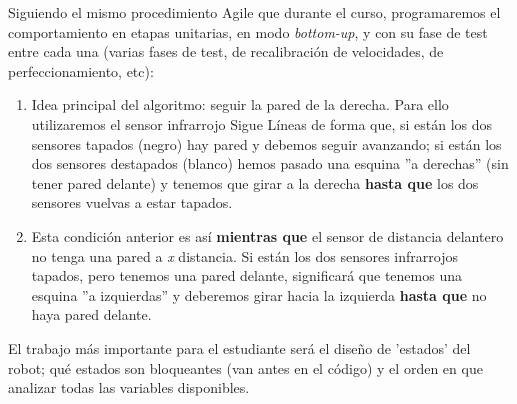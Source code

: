 \begin{description}
	Siguiendo el mismo procedimiento Agile que durante el curso, programaremos el comportamiento en etapas unitarias, en modo \textit{bottom-up}, y con su fase de test entre cada una (varias fases de test, de recalibración de velocidades, de perfeccionamiento, etc):
	\begin{enumerate}
		\item Idea principal del algoritmo: seguir la pared de la derecha. Para ello utilizaremos el sensor infrarrojo Sigue Líneas de forma que, si están los dos sensores tapados (negro) hay pared y debemos seguir avanzando; si están los dos sensores destapados (blanco) hemos pasado una esquina ''a derechas'' (sin tener pared delante) y tenemos que girar a la derecha \textbf{hasta que} los dos sensores vuelvas a estar tapados.
		\item Esta condición anterior es así \textbf{mientras que} el sensor de distancia delantero no tenga una pared a \textit{x} distancia. Si están los dos sensores infrarrojos tapados, pero tenemos una pared delante, significará que tenemos una esquina ''a izquierdas'' y deberemos girar hacia la izquierda \textbf{hasta que} no haya pared delante.
		
	\end{enumerate}
	El trabajo más importante para el estudiante será el diseño de 'estados' del robot; qué estados son bloqueantes (van antes en el código) y el orden en que analizar todas las variables disponibles.
	

\end{description}
